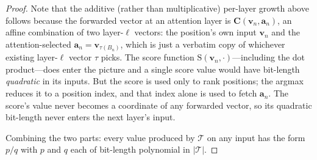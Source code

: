 \documentclass{article} %
\newcommand{\score}{\mathrm{S}}
\newcommand{\matC}{\boldsymbol{C}}
\newcommand{\veca}{\boldsymbol{a}}
\newcommand{\bv}{\boldsymbol{v}}
\newcommand{\trans}{\mathcal{T}}
\begin{document}
\begin{proof}
Note that the additive (rather than multiplicative) per-layer growth above follows because the forwarded vector at an attention layer is $\matC(\bv_n, \veca_n)$, an affine combination of two layer-$\ell$ vectors: the position's own input $\bv_n$ and the attention-selected $\veca_n = \bv_{\tau(B_n)}$, which is just a verbatim copy of whichever existing layer-$\ell$ vector $\tau$ picks. The score function $\score(\bv_n, \cdot)$---including the dot product---does enter the picture and a single score value would have bit-length \emph{quadratic} in its inputs. But the score is used only to rank positions; the argmax reduces it to a position index, and that index alone is used to fetch $\veca_n$. The score's value never becomes a coordinate of any forwarded vector, so its quadratic bit-length never enters the next layer's input.

\medskip\noindent
Combining the two parts: every value produced by $\trans$ on any input has the form $p / q$ with $p$ and $q$ each of bit-length polynomial in $|\trans|$.
\end{proof}
\end{document}
